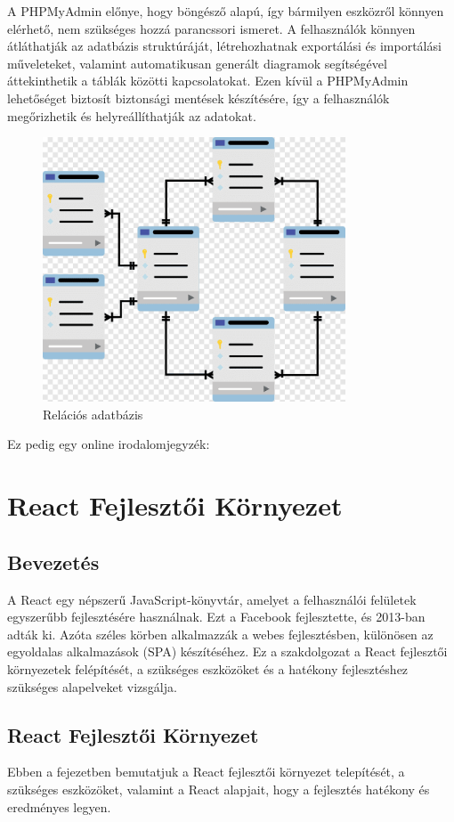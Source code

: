 \documentclass[colorlinks]{thesis-kando}
\theoremstyle{definition}
\theoremstyle{remark}
\begin{document}
A PHPMyAdmin előnye, hogy böngésző alapú, így bármilyen eszközről könnyen elérhető, nem szükséges hozzá parancssori ismeret. A felhasználók könnyen átláthatják az adatbázis struktúráját, létrehozhatnak exportálási és importálási műveleteket, valamint automatikusan generált diagramok segítségével áttekinthetik a táblák közötti kapcsolatokat. Ezen kívül a PHPMyAdmin lehetőséget biztosít biztonsági mentések készítésére, így a felhasználók megőrizhetik és helyreállíthatják az adatokat.

\begin{figure}[ht!]
	\centering
	\includegraphics[width=9cm]{figures/rdb.png}
	\caption[dotNET]{Relációs adatbázis}
\end{figure}
\pagebreak

\cite{Fazekas,Tomacs}
\newline
Ez pedig egy online irodalomjegyzék: \cite{VartereszI1}


\chapter{React Fejlesztői Környezet}

\section{Bevezetés}
A React egy népszerű JavaScript-könyvtár, amelyet a felhasználói felületek egyszerűbb fejlesztésére használnak. Ezt a Facebook fejlesztette, és 2013-ban adták ki. Azóta széles körben alkalmazzák a webes fejlesztésben, különösen az egyoldalas alkalmazások (SPA) készítéséhez. Ez a szakdolgozat a React fejlesztői környezetek felépítését, a szükséges eszközöket és a hatékony fejlesztéshez szükséges alapelveket vizsgálja.

\section{React Fejlesztői Környezet}
Ebben a fejezetben bemutatjuk a React fejlesztői környezet telepítését, a szükséges eszközöket, valamint a React alapjait, hogy a fejlesztés hatékony és eredményes legyen.
\end{document}
